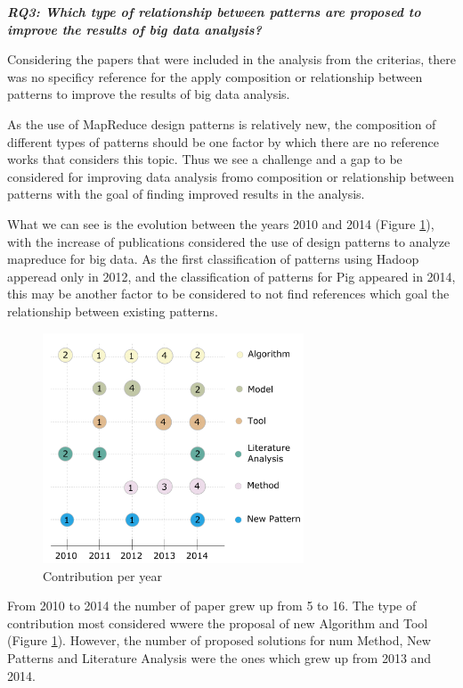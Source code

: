 \bigskip
\textbf{\textit{RQ3: Which type of relationship between patterns are proposed to
improve the results of big data analysis?}}
 
Considering the papers that were included in the analysis from the criterias,
there was no specificy reference for the apply composition or relationship
between patterns to improve the results of big data analysis. 


As the use of MapReduce design patterns is relatively new, the
composition of different types of patterns should be one factor by which
there are no reference works that considers this topic.
Thus we see a challenge and a gap to be considered for improving data analysis
fromo composition or  relationship between patterns with the goal of finding
improved results in the analysis.
 
What we can see is the evolution between the years 2010 and 2014 (Figure
\ref{fig:contribution-per-year}), with the increase of publications considered the use of design patterns to analyze
mapreduce for big data. As the first classification of patterns using Hadoop
apperead only in 2012, and the classification of patterns for Pig appeared
in 2014, this may be another factor to be considered to not find references
which goal the relationship between existing patterns.
  
\begin{figure}[hbtp]
\centering
\includegraphics[width=0.69\textwidth]{figs/ContributionPerYear.pdf}
\caption{Contribution per year}
\label{fig:contribution-per-year}
\end{figure}

From 2010 to 2014 the number of paper grew up from 5 to 16. The type of
contribution most considered wwere the proposal of new Algorithm and Tool
(Figure \ref{fig:contribution-per-year}). However, the number of proposed
solutions for num Method, New Patterns and Literature Analysis were the ones
which grew up from 2013 and 2014. 


